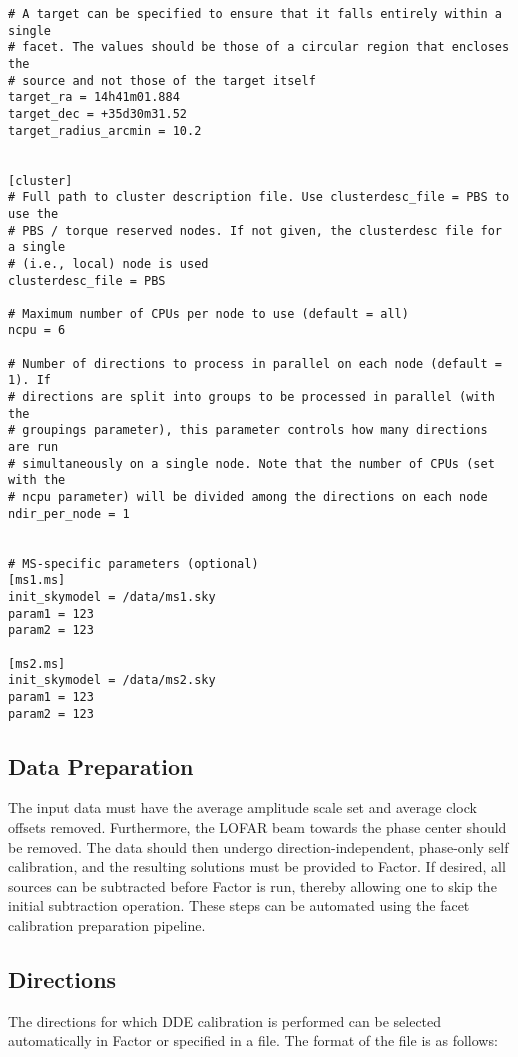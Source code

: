 \documentclass[structabstract]{article}
\begin{document}
\begin{verbatim}
# A target can be specified to ensure that it falls entirely within a single
# facet. The values should be those of a circular region that encloses the
# source and not those of the target itself
target_ra = 14h41m01.884
target_dec = +35d30m31.52
target_radius_arcmin = 10.2


[cluster]
# Full path to cluster description file. Use clusterdesc_file = PBS to use the
# PBS / torque reserved nodes. If not given, the clusterdesc file for a single
# (i.e., local) node is used
clusterdesc_file = PBS

# Maximum number of CPUs per node to use (default = all)
ncpu = 6

# Number of directions to process in parallel on each node (default = 1). If
# directions are split into groups to be processed in parallel (with the
# groupings parameter), this parameter controls how many directions are run
# simultaneously on a single node. Note that the number of CPUs (set with the
# ncpu parameter) will be divided among the directions on each node
ndir_per_node = 1


# MS-specific parameters (optional)
[ms1.ms]
init_skymodel = /data/ms1.sky
param1 = 123
param2 = 123

[ms2.ms]
init_skymodel = /data/ms2.sky
param1 = 123
param2 = 123
\end{verbatim}


\subsection{Data Preparation}
\label{factor:data}

The input data must have the average amplitude scale set and average clock
offsets removed. Furthermore, the LOFAR beam towards the phase center should be
removed. The data should then undergo direction-independent, phase-only self
calibration, and the resulting solutions must be provided to Factor. If desired,
all sources can be subtracted before Factor is run, thereby allowing one to skip
the initial subtraction operation. These steps can be automated using the facet
calibration preparation pipeline.

\subsection{Directions}
\label{factor:directions}

The directions for which DDE calibration is performed can be selected
automatically in Factor or specified in a file. The format of the file is as
follows:
\end{document}
